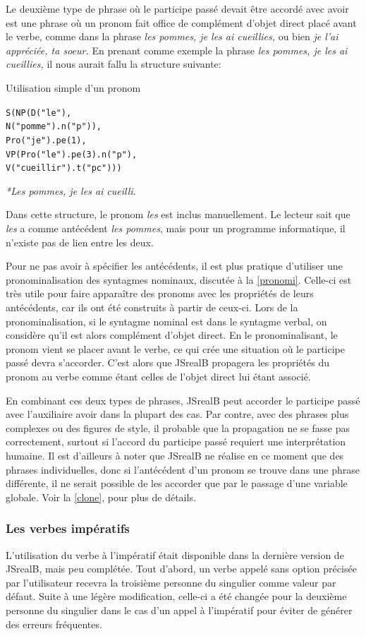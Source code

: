 \documentclass[11pt]{article} %
\newcommand{\system}[1]{\textsf{#1}}
\newcommand{\JSB}{\system{JSrealB}}
\newcommand{\real}[1]{\emph{#1}}
\begin{document}
Le deuxième type de phrase où le participe passé devait être accordé
avec avoir est une phrase où un pronom fait office de complément d'objet
direct placé avant le verbe, comme dans la phrase \emph{les pommes,
je les ai cueillies, }ou bien \emph{je l'ai appréciée, ta soeur. }En
prenant comme exemple la phrase \emph{les pommes, je les ai cueillies,
}il nous aurait fallu la structure suivante:
\begin{example}
\caption{Utilisation simple d'un pronom}
\begin{alltt}
S(NP(D("le"),
     N("pomme").n("p")),
  Pro("je").pe(1),
  VP(Pro("le").pe(3).n("p"),
     V("cueillir").t("pc")))
\end{alltt}
\real{*Les pommes, je les ai cueilli.}
\end{example}

Dans cette structure, le pronom \emph{les} est inclus manuellement.
Le lecteur sait que \emph{les} a comme antécédent \emph{les pommes},
mais pour un programme informatique, il n'existe pas de lien entre
les deux. 

Pour ne pas avoir à spécifier les antécédents, il est
plus pratique d'utiliser une pronominalisation des syntagmes
nominaux, discutée à la \autoref{pronomi}. Celle-ci est très utile pour
faire apparaître des pronoms avec les propriétés de leurs
antécédents, car ils ont été construits à partir de ceux-ci. Lors
de la pronominalisation, si le syntagme nominal est dans le syntagme
verbal, on considère qu'il est alors complément d'objet direct. En
le pronominalisant, le pronom vient se placer avant le verbe, ce qui
crée une situation où le participe passé devra s'accorder. C'est alors
que \JSB{} propagera les propriétés du pronom au verbe comme étant
celles de l'objet direct lui étant associé.

En combinant ces deux types de phrases, \JSB{} peut
accorder le participe passé avec l'auxiliaire avoir dans
la plupart des cas. Par contre, avec
des phrases plus complexes ou des figures de style, il probable que
la propagation ne se fasse pas correctement, surtout si l'accord du
participe passé requiert une interprétation humaine. Il
est d'ailleurs à noter que \JSB{} ne réalise en ce moment que des
phrases individuelles, donc si l'antécédent d'un pronom se trouve
dans une phrase différente, il ne serait possible de les accorder que
par le passage d'une variable globale. Voir la \autoref{clone}, pour plus de détails.


\subsubsection{Les verbes impératifs}
\label{imperatif}
L'utilisation du verbe à l'impératif était disponible dans la dernière
version de \JSB{}, mais peu complétée. Tout d'abord, un verbe appelé
sans option précisée par l'utilisateur recevra la troisième personne
du singulier comme valeur par défaut. Suite à une légère modification,
celle-ci a été changée pour la deuxième personne du singulier dans
le cas d'un appel à l'impératif pour éviter de générer des erreurs
fréquentes.
\end{document}
